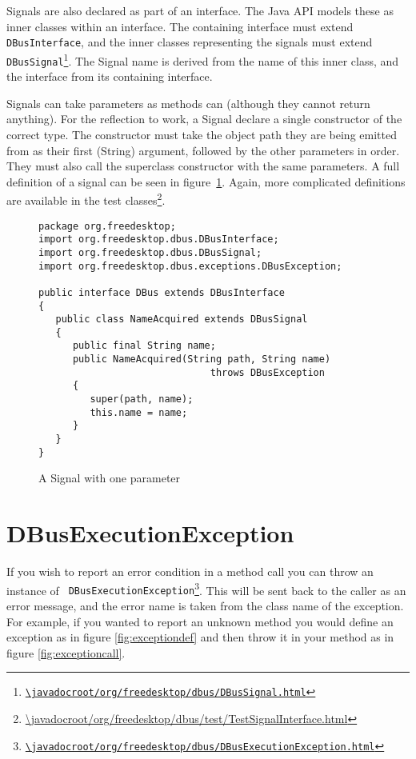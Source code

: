 \documentclass[a4paper,12pt]{article}
\begin{document}
Signals are also declared as part of an interface. The Java API
models these as inner classes within an interface. The containing
interface must extend {\tt DBusInterface}, and the inner classes
representing the signals must extend {\tt
DBusSignal\footnote{\url{\javadocroot/org/freedesktop/dbus/DBusSignal.html}}}.
The Signal name is derived from the name of this inner class, and
the interface from its containing interface.

Signals can take parameters as methods can (although they cannot return
      anything). For the reflection to work, a Signal declare a single
constructor of the correct type. The constructor must  take the object path
they are being emitted from as their first (String) argument, followed by the
other parameters in order. They must also call the superclass constructor with
the same parameters.  A full definition of a signal can be seen in
figure~\ref{fig:signal}. Again, more complicated definitions are available in
the test
classes\footnote{\url{\javadocroot/org/freedesktop/dbus/test/TestSignalInterface.html}}.

\begin{figure}[htb]
\begin{center}
\begin{verbatim}
package org.freedesktop;
import org.freedesktop.dbus.DBusInterface;
import org.freedesktop.dbus.DBusSignal;
import org.freedesktop.dbus.exceptions.DBusException;

public interface DBus extends DBusInterface
{
   public class NameAcquired extends DBusSignal
   {
      public final String name;
      public NameAcquired(String path, String name) 
                              throws DBusException
      {
         super(path, name);
         this.name = name;
      }
   }
}
\end{verbatim}
\end{center}
\caption{A Signal with one parameter}
\label{fig:signal}
\end{figure}

\section{DBusExecutionException}

If you wish to report an error condition in a method call you can throw an
instance of {\tt
DBusExecutionException\footnote{\url{\javadocroot/org/freedesktop/dbus/DBusExecutionException.html}}}.
This will be sent back to the caller as an error message, and the error name is
taken from the class name of the exception. For example, if you wanted to
report an unknown method you would define an exception as in figure
\ref{fig:exceptiondef} and then throw it in your method as in figure
\ref{fig:exceptioncall}.
\end{document}
